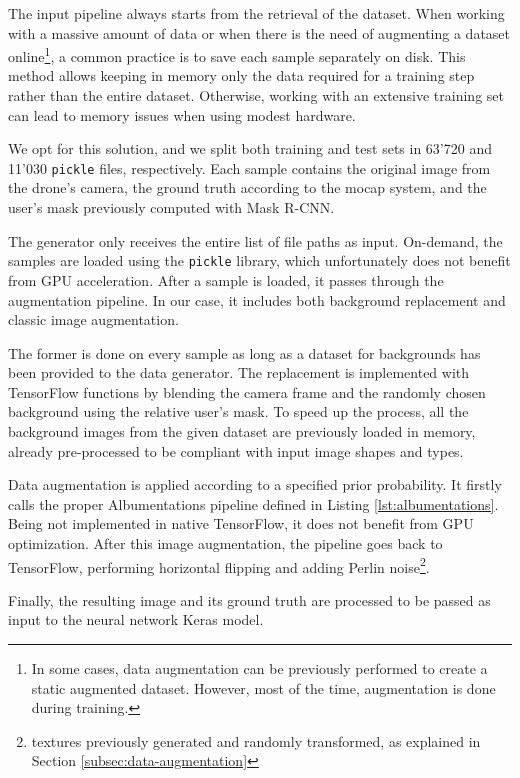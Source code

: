 The input pipeline always starts from the retrieval of the dataset. When working with a massive amount of data or when there is the need of augmenting a dataset online\footnote{In some cases, data augmentation can be previously performed to create a static augmented dataset. However, most of the time, augmentation is done during training.}, a common practice is to save each sample separately on disk. This method allows keeping in memory only the data required for a training step rather than the entire dataset. Otherwise, working with an extensive training set can lead to memory issues when using modest hardware.

We opt for this solution, and we split both training and test sets in 63'720 and 11'030 \texttt{pickle} files, respectively. Each sample contains the original image from the drone's camera, the ground truth according to the \gls{mocap} system, and the user's mask previously computed with Mask R-CNN.

\medskip

The generator only receives the entire list of file paths as input. On-demand, the samples are loaded using the \texttt{pickle} library, which unfortunately does not benefit from GPU acceleration. After a sample is loaded, it passes through the augmentation pipeline. In our case, it includes both background replacement and classic image augmentation. 

The former is done on every sample as long as a dataset for backgrounds has been provided to the data generator. The replacement is implemented with TensorFlow functions by blending the camera frame and the randomly chosen background using the relative user's mask. To speed up the process, all the background images from the given dataset are previously loaded in memory, already pre-processed to be compliant with input image shapes and types.

Data augmentation is applied according to a specified prior probability. It firstly calls the proper Albumentations pipeline defined in Listing \ref{lst:albumentations}. Being not implemented in native TensorFlow, it does not benefit from GPU optimization. After this image augmentation, the pipeline goes back to TensorFlow, performing horizontal flipping and adding Perlin noise\footnote{textures previously generated and randomly transformed, as explained in Section \ref{subsec:data-augmentation}}. 

Finally, the resulting image and its ground truth are processed to be passed as input to the neural network Keras model.



